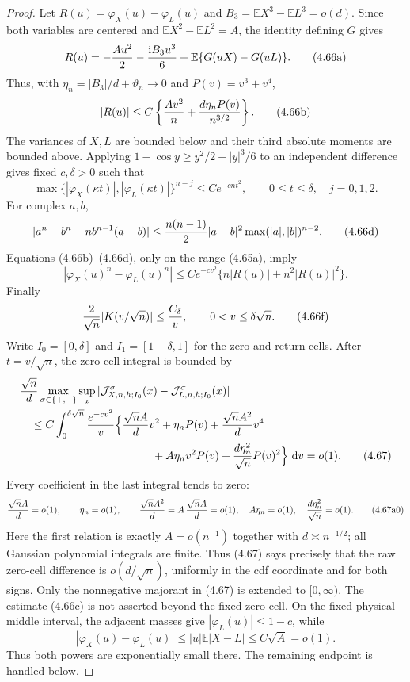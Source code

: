 \documentclass[11pt,a4paper]{article}
\numberwithin{equation}{section}
\theoremstyle{definition}
\theoremstyle{remark}
\newcommand{\E}{\mathbb E}
\newcommand{\ii}{\mathrm i}
\newcommand{\dd}{\,\mathrm d}
\begin{document}
\begin{proof}
Let $R(u)=\varphi_X(u)-\varphi_L(u)$ and
$B_3=\E X^3-\E L^3=o(d)$.  Since both variables are centered and
$\E X^2-\E L^2=A$, the identity defining $G$ gives
\[
 R(u)=-{Au^2\over2}-{\ii B_3u^3\over6}
       +\E\{G(uX)-G(uL)\}.                            \tag{4.66a}
\]
Thus, with
$\eta_n=|B_3|/d+\vartheta_n\to0$ and
$P(v)=v^3+v^4$,
\[
 |R(u)|\le C\left\{{Av^2\over n}
              +{d\eta_nP(v)\over n^{3/2}}\right\}.  \tag{4.66b}
\]
The variances of $X,L$ are bounded below and their third absolute moments
are bounded above.  Applying
$1-\cos y\ge y^2/2-|y|^3/6$ to an independent difference gives fixed
$c,\delta>0$ such that
\[
 \max\{|\varphi_X(\kappa t)|,|\varphi_L(\kappa t)|\}^{n-j}
 \le Ce^{-cnt^2},\qquad 0\le t\le\delta,\quad j=0,1,2. \tag{4.66c}
\]
For complex $a,b$,
\[
 |a^n-b^n-nb^{n-1}(a-b)|
 \le {n(n-1)\over2}|a-b|^2\max(|a|,|b|)^{n-2}.       \tag{4.66d}
\]
Equations (4.66b)--(4.66d), only on the range (4.65a), imply
\[
 |\varphi_X(u)^n-\varphi_L(u)^n|
 \le Ce^{-cv^2}\{n|R(u)|+n^2|R(u)|^2\}.              \tag{4.66e}
\]
Finally
\[
 {2\over\sqrt n}|K(v/\sqrt n)|\le {C_\delta\over v},
 \qquad 0<v\le\delta\sqrt n.                         \tag{4.66f}
\]
Write $I_0=[0,\delta]$ and $I_1=[1-\delta,1]$ for the zero and return
cells.  After $t=v/\sqrt n$, the zero-cell integral is bounded by
\begin{align}
 &{\sqrt n\over d}\max_{\sigma\in\{+,-\}}\sup_x
 |\mathcal J^\sigma_{X,n,h;I_0}(x)
       -\mathcal J^\sigma_{L,n,h;I_0}(x)|                         \notag\\
 &\quad\le C\int_0^{\delta\sqrt n}{e^{-cv^2}\over v}
 \Big\{{\sqrt nA\over d}v^2+\eta_nP(v)
       +{\sqrt nA^2\over d}v^4                         \notag\\
 &\hspace{42mm}+A\eta_nv^2P(v)+{d\eta_n^2\over\sqrt n}P(v)^2
 \Big\}\,\dd v=o(1).                                 \tag{4.67}
\end{align}
Every coefficient in the last integral tends to zero:
\[
 {\sqrt nA\over d}=o(1),\qquad \eta_n=o(1),\qquad
 {\sqrt nA^2\over d}=A\,{\sqrt nA\over d}=o(1),
 \quad A\eta_n=o(1),\quad {d\eta_n^2\over\sqrt n}=o(1). \tag{4.67a0}
\]
Here the first relation is exactly $A=o(n^{-1})$ together with
$d\asymp n^{-1/2}$; all Gaussian polynomial integrals are finite.
Thus (4.67) says precisely that the raw zero-cell difference is
$o(d/\sqrt n)$, uniformly in the cdf coordinate and for both signs.
Only the nonnegative majorant in (4.67) is extended to $[0,\infty)$.
The estimate (4.66c) is not asserted beyond the fixed zero cell.  On the
fixed physical middle interval, the adjacent masses give
$|\varphi_L(u)|\le1-c$, while
\[
 |\varphi_X(u)-\varphi_L(u)|\le |u|\E|X-L|\le C\sqrt A=o(1).
\]
Thus both powers are exponentially small there.  The remaining endpoint
is handled below.


\end{proof}
\end{document}
